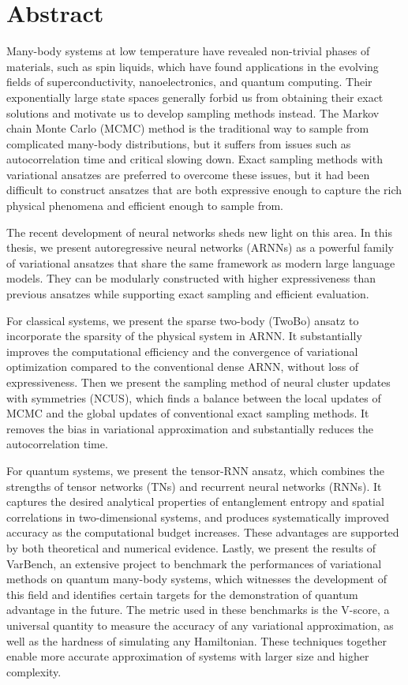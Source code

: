 \cleardoublepage
\chapter*{Abstract}

Many-body systems at low temperature have revealed non-trivial phases of materials, such as spin liquids, which have found applications in the evolving fields of superconductivity, nanoelectronics, and quantum computing.
Their exponentially large state spaces generally forbid us from obtaining their exact solutions and motivate us to develop sampling methods instead.
The Markov chain Monte Carlo (MCMC) method is the traditional way to sample from complicated many-body distributions, but it suffers from issues such as autocorrelation time and critical slowing down.
Exact sampling methods with variational ansatzes are preferred to overcome these issues, but it had been difficult to construct ansatzes that are both expressive enough to capture the rich physical phenomena and efficient enough to sample from.

The recent development of neural networks sheds new light on this area.
In this thesis, we present autoregressive neural networks (ARNNs) as a powerful family of variational ansatzes that share the same framework as modern large language models.
They can be modularly constructed with higher expressiveness than previous ansatzes while supporting exact sampling and efficient evaluation.

For classical systems, we present the sparse two-body (TwoBo) ansatz to incorporate the sparsity of the physical system in ARNN.
It substantially improves the computational efficiency and the convergence of variational optimization compared to the conventional dense ARNN, without loss of expressiveness.
Then we present the sampling method of neural cluster updates with symmetries (NCUS), which finds a balance between the local updates of MCMC and the global updates of conventional exact sampling methods.
It removes the bias in variational approximation and substantially reduces the autocorrelation time.

For quantum systems, we present the tensor-RNN ansatz, which combines the strengths of tensor networks (TNs) and recurrent neural networks (RNNs).
It captures the desired analytical properties of entanglement entropy and spatial correlations in two-dimensional systems, and produces systematically improved accuracy as the computational budget increases.
These advantages are supported by both theoretical and numerical evidence.
Lastly, we present the results of VarBench, an extensive project to benchmark the performances of variational methods on quantum many-body systems, which witnesses the development of this field and identifies certain targets for the demonstration of quantum advantage in the future.
The metric used in these benchmarks is the V-score, a universal quantity to measure the accuracy of any variational approximation, as well as the hardness of simulating any Hamiltonian.
These techniques together enable more accurate approximation of systems with larger size and higher complexity.

